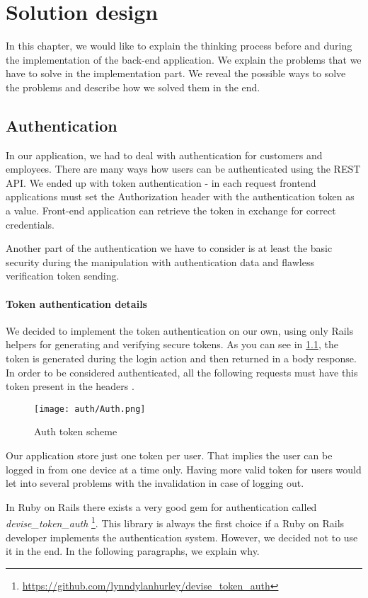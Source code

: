 \chapter{Solution design}
In this chapter, we would like to explain the thinking process before and during the implementation of the back-end application. We explain the problems that we have to solve in the implementation part. We reveal the possible ways to solve the problems and describe how we solved them in the end.

\section{Authentication}
In our application, we had to deal with authentication for customers and employees. There are many ways how users can be authenticated using the REST API. We ended up with token authentication - in each request frontend applications must set the Authorization header with the authentication token as a value. Front-end application can retrieve the token in exchange for correct credentials.

Another part of the authentication we have to consider is at least the basic security during the manipulation with authentication data and flawless verification token sending.

\subsubsection{Token authentication details}

We decided to implement the token authentication on our own, using only Rails helpers for generating and verifying secure tokens. As you can see in \ref{auth-token-scheme}, the token is generated during the login action and then returned in a body response. In order to be considered authenticated, all the following requests must have this token present in the headers .

\begin{figure}[h]\centering
\texttt{[image: auth/Auth.png]} 
\caption{Auth token scheme}\label{auth-token-scheme}
\end{figure}

Our application store just one token per user. That implies the user can be logged in from one device at a time only. Having more valid token for users would let into several problems with the invalidation in case of logging out.

In Ruby on Rails there exists a very good gem for authentication called \textit{devise\_token\_auth} \footnote{\url{https://github.com/lynndylanhurley/devise\_token\_auth}}. This library is always the first choice if a Ruby on Rails developer implements the authentication system. However, we decided not to use it in the end. In the following paragraphs, we explain why.

